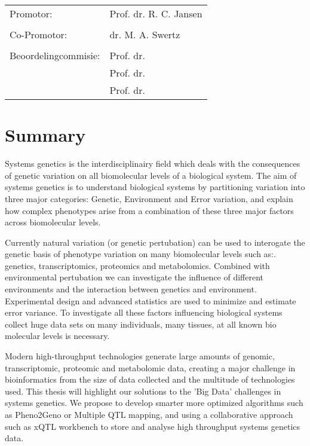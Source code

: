 \documentclass[11pt, twoside]{extbook}
\begin{document}
\newpage
\thispagestyle{empty}
\begin{tabular}{ l l }
Promotor:             & Prof. dr. R. C. Jansen \\
                      & \\
Co-Promotor:          & dr. M. A. Swertz \\
                      & \\
Beoordelingcommisie:  & Prof. dr. \\
                      & Prof. dr. \\
                      & Prof. dr. \\
\end{tabular}
\tableofcontents
\newpage
\chapter*{Summary}\vspace{-30pt}
Systems genetics is the interdisciplinairy field which deals with the consequences of genetic 
variation on all biomolecular levels of a biological system. The aim of systems genetics is to 
understand biological systems by partitioning variation into three major categories: Genetic, 
Environment and Error variation, and explain how complex phenotypes arise from a combination 
of these three major factors across biomolecular levels.

Currently natural variation (or genetic pertubation) can be used to interogate the genetic basis 
of phenotype variation on many biomolecular levels such as:. genetics, transcriptomics, proteomics 
and metabolomics. Combined with environmental pertubation we can investigate the influence of 
different environments and the interaction between genetics and environment. Experimental design 
and advanced statistics are used to minimize and estimate error variance. To investigate all these 
factors influencing biological systems collect huge data sets on many individuals, many tissues, at 
all known bio molecular levels is necessary.

Modern high-throughput technologies generate large amounts of genomic, transcriptomic, proteomic 
and metabolomic data, creating a major challenge in bioinformatics from the size of data collected 
and the multitude of technologies used. This thesis will highlight our solutions to the 'Big Data' 
challenges in systems genetics. We propose to develop smarter more optimized algorithms such as 
Pheno2Geno or Multiple QTL mapping, and using a collaborative approach such as xQTL workbench 
to store and analyse high throughput systems genetics data.
\end{document}

